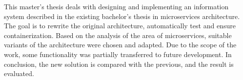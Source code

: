 This master's thesis deals with designing and implementing an information system described in the existing bachelor's thesis in microservices architecture.
The goal is to rewrite the original architecture, automatically test and ensure containerization.
Based on the analysis of the area of microservices, suitable variants of the architecture were chosen and adapted.
Due to the scope of the work, some functionality was partially transferred to future development.
In conclusion, the new solution is compared with the previous, and the result is evaluated.
